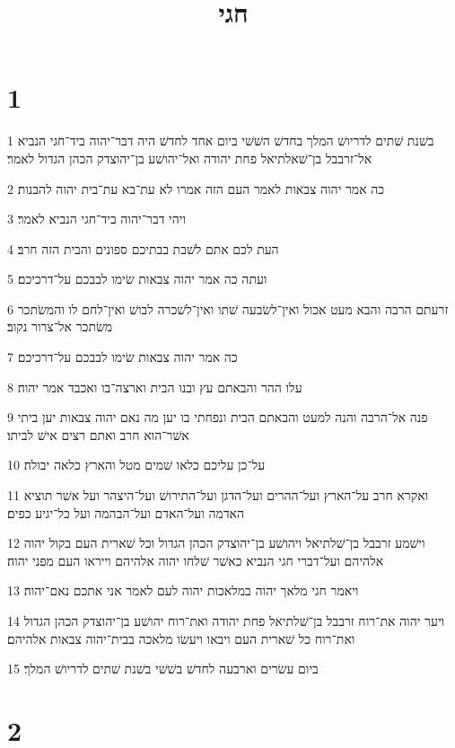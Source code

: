 

\title{חגי}


\chapter{1}

\par 1 בשׁנת שׁתים לדריושׁ המלך בחדשׁ השׁשׁי ביום אחד לחדשׁ היה דבר־יהוה ביד־חגי הנביא אל־זרבבל בן־שׁאלתיאל פחת יהודה ואל־יהושׁע בן־יהוצדק הכהן הגדול לאמר׃
\par 2 כה אמר יהוה צבאות לאמר העם הזה אמרו לא עת־בא עת־בית יהוה להבנות׃
\par 3 ויהי דבר־יהוה ביד־חגי הנביא לאמר׃
\par 4 העת לכם אתם לשׁבת בבתיכם ספונים והבית הזה חרב׃
\par 5 ועתה כה אמר יהוה צבאות שׂימו לבבכם על־דרכיכם׃
\par 6 זרעתם הרבה והבא מעט אכול ואין־לשׂבעה שׁתו ואין־לשׁכרה לבושׁ ואין־לחם לו והמשׂתכר משׂתכר אל־צרור נקוב׃
\par 7 כה אמר יהוה צבאות שׂימו לבבכם על־דרכיכם׃
\par 8 עלו ההר והבאתם עץ ובנו הבית וארצה־בו ואכבד אמר יהוה׃
\par 9 פנה אל־הרבה והנה למעט והבאתם הבית ונפחתי בו יען מה נאם יהוה צבאות יען ביתי אשׁר־הוא חרב ואתם רצים אישׁ לביתו׃
\par 10 על־כן עליכם כלאו שׁמים מטל והארץ כלאה יבולה׃
\par 11 ואקרא חרב על־הארץ ועל־ההרים ועל־הדגן ועל־התירושׁ ועל־היצהר ועל אשׁר תוציא האדמה ועל־האדם ועל־הבהמה ועל כל־יגיע כפים׃
\par 12 וישׁמע זרבבל בן־שׁלתיאל ויהושׁע בן־יהוצדק הכהן הגדול וכל שׁארית העם בקול יהוה אלהיהם ועל־דברי חגי הנביא כאשׁר שׁלחו יהוה אלהיהם וייראו העם מפני יהוה׃
\par 13 ויאמר חגי מלאך יהוה במלאכות יהוה לעם לאמר אני אתכם נאם־יהוה׃
\par 14 ויער יהוה את־רוח זרבבל בן־שׁלתיאל פחת יהודה ואת־רוח יהושׁע בן־יהוצדק הכהן הגדול ואת־רוח כל שׁארית העם ויבאו ויעשׂו מלאכה בבית־יהוה צבאות אלהיהם׃
\par 15 ביום עשׂרים וארבעה לחדשׁ בשׁשׁי בשׁנת שׁתים לדריושׁ המלך׃

\chapter{2}

